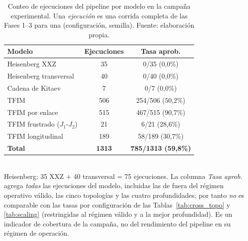 \begin{table}[htbp]
\centering
\caption[Conteo de ejecuciones por modelo]{Conteo de ejecuciones del pipeline por modelo en la campaña experimental. Una \emph{ejecución} es una corrida completa de las Fases 1--3 para una (configuración, semilla). Fuente: elaboración propia.}
\label{tab:auto_campaign}
\begin{tabular}{lcc}
\toprule
Modelo & Ejecuciones & Tasa aprob. \\
\midrule
Heisenberg XXZ & 35 & 0/35 (0,0\%) \\
Heisenberg transversal & 40 & 0/40 (0,0\%) \\
Cadena de Kitaev & 7 & 0/7 (0,0\%) \\
TFIM & 506 & 254/506 (50,2\%) \\
TFIM por enlace & 515 & 467/515 (90,7\%) \\
TFIM frustrado ($J_1$-$J_2$) & 21 & 6/21 (28,6\%) \\
TFIM longitudinal & 189 & 58/189 (30,7\%) \\
\textbf{Total} & \textbf{1313} & \textbf{785/1313 (59,8\%)} \\
\bottomrule
\end{tabular}
\\[2pt]
\footnotesize Heisenberg: 35 XXZ + 40 transversal = 75 ejecuciones. La columna \emph{Tasa aprob.} agrega \emph{todas} las ejecuciones del modelo, incluidas las de fuera del régimen operativo válido, las cinco topologías y las cuatro profundidades; por tanto \emph{no} es comparable con las tasas por configuración de las Tablas~\ref{tab:cross_topo} y \ref{tab:scaling} (restringidas al régimen válido y a la mejor profundidad). Es un indicador de cobertura de la campaña, no del rendimiento del pipeline en su régimen de operación.
\end{table}

